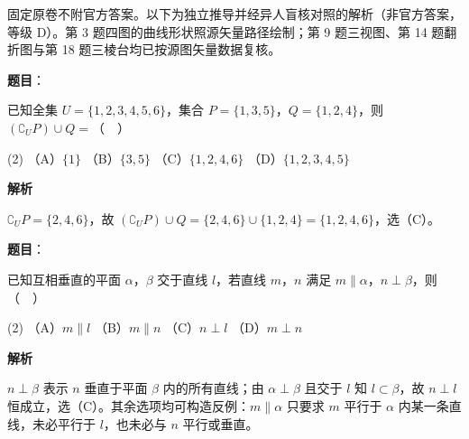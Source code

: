 

\begin{gktip}
固定原卷不附官方答案。以下为独立推导并经异人盲核对照的解析（非官方答案，等级 D）。第 3 题四图的曲线形状照源矢量路径绘制；第 9 题三视图、第 14 题翻折图与第 18 题三棱台均已按源图矢量数据复核。
\end{gktip}

\begin{answer}

\textbf{题目}：

已知全集 \(U=\{1,2,3,4,5,6\}\)，集合 \(P=\{1,3,5\}\)，\(Q=\{1,2,4\}\)，则 \((\complement_U P)\cup Q=\)（　）

\begin{gkopts}(2)
\task （A）\(\{1\}\)
\task （B）\(\{3,5\}\)
\task （C）\(\{1,2,4,6\}\)
\task （D）\(\{1,2,3,4,5\}\)
\end{gkopts}

\textbf{解析}

\(\complement_U P=\{2,4,6\}\)，故 \((\complement_U P)\cup Q=\{2,4,6\}\cup\{1,2,4\}=\{1,2,4,6\}\)，选（C）。


\end{answer}
\begin{answer}

\textbf{题目}：

已知互相垂直的平面 \(\alpha\)，\(\beta\) 交于直线 \(l\)，若直线 \(m\)，\(n\) 满足 \(m\parallel\alpha\)，\(n\perp\beta\)，则（　）

\begin{gkopts}(2)
\task （A）\(m\parallel l\)
\task （B）\(m\parallel n\)
\task （C）\(n\perp l\)
\task （D）\(m\perp n\)
\end{gkopts}

\textbf{解析}

\(n\perp\beta\) 表示 \(n\) 垂直于平面 \(\beta\) 内的所有直线；由 \(\alpha\perp\beta\) 且交于 \(l\) 知 \(l\subset\beta\)，故 \(n\perp l\) 恒成立，选（C）。其余选项均可构造反例：\(m\parallel\alpha\) 只要求 \(m\) 平行于 \(\alpha\) 内某一条直线，未必平行于 \(l\)，也未必与 \(n\) 平行或垂直。


\end{answer}
